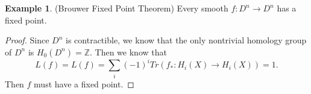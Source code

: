 \documentclass[psamsfonts]{amsart}
\theoremstyle{definition}
\newtheorem{exmp}[theorem]{Example}
\theoremstyle{remark}
\numberwithin{equation}{section}
\begin{document}
		\begin{exmp}(Brouwer Fixed Point Theorem)
			Every smooth $f: D^n \to D^n$ has a fixed point.
		\end{exmp}
		\begin{proof}
			Since $D^n$ is contractible, we know that the only nontrivial homology group of $D^n$ is $H_0(D^n) = \mathbb{Z}$. Then we know that 
			\begin{equation}
				L(f) = L(f) = \sum_{i} (-1)^i Tr(f_*: H_i(X) \to H_i(X)) = 1.
			\end{equation}
			Then $f$ must have a fixed point.
		\end{proof}
\end{document}
